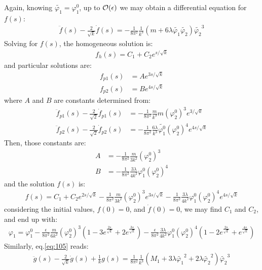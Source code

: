 Again, knowing $\tilde{\varphi_{1}} = \varphi_{1}^{0}$, up to $\order{\epsilon}$ we may obtain a differential equation for $f(s)$:
\begin{align}
    \ddot f (s) - \frac{2}{\sqrt{k}} \dot f(s) = -\frac{1}{8\pi^{2}}\frac{1}{k^{3}}(m+6\lambda \tilde{\varphi_{1}} \tilde{\varphi_{2}})\tilde{\varphi_{2}}^{3}
\end{align}
Solving for $f(s)$, the homogeneous solution is:
\begin{align}
    f_{h} (s) = C_{1} + C_{2} e^{s/\sqrt{k}}
\end{align}
and particular solutions are:
\begin{align}
    f_{p1} (s) &= A e^{3s/\sqrt{k}} \\
    f_{p2} (s) &= B e^{4s/ \sqrt{k}}  
\end{align}
where $A$ and $B$ are constants determined from:
\begin{align}
    \ddot f_{p1} (s) -\frac{2}{\sqrt{2}} \dot f_{p1} (s) &= -\frac{1}{8\pi^{2}} \frac{m}{k^{3}} m (\varphi_{2}^{0})^{3} e^{3/\sqrt{k}} \\
    \ddot f_{p2} (s) - \frac{2}{\sqrt{2}} \dot f_{p2} (s) &= -\frac{1}{8\pi^{2}} \frac{6\lambda}{k^{3}} \tilde{\varphi_{1}^{0}}(\varphi_{2}^{0})^{4} e^{4s/\sqrt{k}}
\end{align}
Then, those constants are:
\begin{align}
    A & = -\frac{1}{8\pi^{2}} \frac{m}{3k^{2}} (\varphi_{2}^{0})^{3} \\
    B &= -\frac{1}{8\pi^{2}} \frac{3\lambda}{4k^{2}}\varphi_{1}^{0} (\varphi_{2} ^{0})^{4}
\end{align}
and the solution $f(s)$ is:
\begin{align}
    f(s) = C_{1} + C_{2} e^{2s/\sqrt{k}} -\frac{1}{8\pi^{2}} \frac{m}{3k^{2}} (\varphi_{2}^{0})^{3} e^{3s/\sqrt{k}}  -\frac{1}{8\pi^{2}} \frac{3\lambda}{4k^{2}}\varphi_{1}^{0} (\varphi_{2} ^{0})^{4} e^{4s/\sqrt{k}}
\end{align}
considering the initial values, $f(0) = 0$, and $\dot f(0) = 0$, we may find $C_{1}$ and $C_{2}$, and end up with:
\begin{align}
    \varphi_{1} = \varphi_{1}^{0} - \frac{\epsilon}{8\pi^{2}} \frac{m}{6k^{2}} (\varphi_{2}^{0})^{3} (1-3e^{\frac{2s}{\sqrt{k}}} + 2e^{\frac{3s}{\sqrt{k}}}) - \frac{\epsilon}{8\pi^{2}}\frac{3\lambda}{4k^{2}}\varphi_{1}^{0} (\varphi_{2}^{0})^{4} (1-2e^{\frac{2s}{\sqrt{k}}} + e^{\frac{4s}{\sqrt{k}}})
\end{align}
Similarly, eq.\ref{eq:105} reads:
\begin{align}
    \ddot g(s) - \frac{2}{\sqrt{k}} \dot g(s) +\frac{1}{k}g(s) = \frac{1}{8\pi^{2}}\frac{1}{k^{3}} (M_{1} + 3\lambda \tilde{\varphi_{1}}^{2} + 2\lambda \tilde{\varphi_{2}}^{2})\tilde{\varphi_{2}} ^{3}
\end{align}
